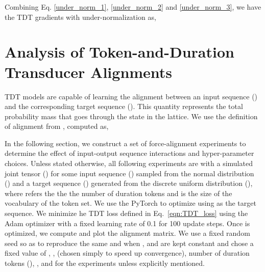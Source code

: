 \documentclass{article}
\begin{document}
Combining Eq. \ref{under_norm_1}, \ref{under_norm_2} and \ref{under_norm_3}, we have the TDT gradients with under-normalization as,
































































\section{Analysis of Token-and-Duration Transducer Alignments}

TDT models are capable of learning the alignment  between an input sequence () and the corresponding target sequence (). This quantity represents the total probability mass that goes through the state  in the lattice.
We use the definition of alignment  from \cite{yu2021fastemit},  computed as,

In the following section, we construct a set of force-alignment experiments to determine the effect of input-output sequence interactions and hyper-parameter choices. 
Unless stated otherwise, all following experiments are with a simulated joint tensor () for some input sequence () sampled from the normal distribution () and a target sequence () generated from the discrete uniform distribution (), where  refers the the the number of duration tokens and  is the size of the vocabulary of the token set. We use the PyTorch  \cite{paszke_pytorch} to optimize  using  as the target sequence. 
We minimize he TDT loss defined in Eq.~\ref{eqn:TDT_loss} using the Adam optimizer \cite{kingma_adam} with 
a fixed learning rate of 0.1 
for 100 update steps. Once  is optimized, we compute 
  and plot the  alignment matrix. We use a fixed random seed so as to reproduce the same  and  when ,  and  are kept constant and chose a fixed value of , ,  (chosen simply to speed up convergence), number of duration tokens (), ,  and  for the experiments unless explicitly mentioned. 
\end{document}

